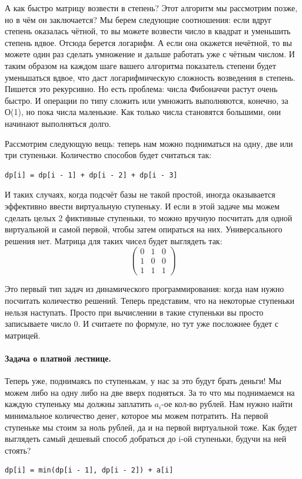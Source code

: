 \documentclass[12pt]{article}
\begin{document}
А как быстро матрицу возвести в степень? Этот алгоритм мы рассмотрим позже, но в чём он заключается? Мы берем следующие соотношения: если вдруг степень оказалась чётной, то вы можете возвести число в квадрат и уменьшить степень вдвое. Отсюда берется логарифм. А если она окажется нечётной, то вы можете один раз сделать умножение и дальше работать уже с чётным числом. И таким образом на каждом шаге вашего алгоритма показатель степени будет уменьшаться вдвое, что даст логарифмическую сложность возведения в степень. Пишется это рекурсивно. Но есть проблема: числа Фибоначчи растут очень быстро. И операции по типу сложить или умножить выполняются, конечно, за О(1), но пока числа маленькие. Как только числа становятся большими, они начинают выполняться долго.

Рассмотрим следующую вещь: теперь нам можно подниматься на одну, две или три ступеньки. Количество способов будет считаться так:

\begin{verbatim}
dp[i] = dp[i - 1] + dp[i - 2] + dp[i - 3]
\end{verbatim}

И таких случаях, когда подсчёт базы не такой простой, иногда оказывается эффективно ввести виртуальную ступеньку. И если в этой задаче мы можем сделать целых 2 фиктивные ступеньки, то можно вручную посчитать для одной виртуальной и самой первой, чтобы затем опираться на них. Универсального решения нет. Матрица для таких чисел будет выглядеть так:
\[
\begin{pmatrix}
0 & 1 & 0 \\
1 & 0 & 0 \\
1 & 1 & 1
\end{pmatrix}
\]

Это первый тип задач из динамического программирования: когда нам нужно посчитать количество решений. Теперь представим, что на некоторые ступеньки нельзя наступать. Просто при вычислении в такие ступеньки вы просто записываете число 0. И считаете по формуле, но тут уже посложнее будет с матрицей. 

\paragraph*{Задача о платной лестнице.}
Теперь уже, поднимаясь по ступенькам, у нас за это будут брать деньги! Мы можем либо на одну либо на две вверх подняться. За то что мы поднимаемся на каждую ступеньку мы должны заплатить $a_i$-ое кол-во рублей. Нам нужно найти минимальное количество денег, которое мы можем потратить. На первой ступеньке мы стоим за ноль рублей, да и на первой виртуальной тоже. Как будет выглядеть самый дешевый способ добраться до i-ой ступеньки, будучи на ней стоять?
\begin{verbatim}
dp[i] = min(dp[i - 1], dp[i - 2]) + a[i]
\end{verbatim}
\end{document}
